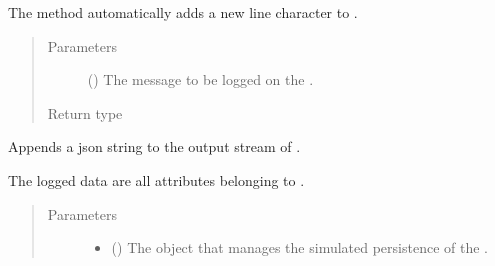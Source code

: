 \documentclass[letterpaper,10pt,english]{sphinxmanual}
\begin{document}
\begin{fulllineitems}
\begin{fulllineitems}
The method automatically adds a new line character to .
\begin{quote}\begin{description}
\item[{Parameters}] \leavevmode
{} () \textendash{} The message to be logged on the {\hyperref[\detokenize{app.domain.helpers:app.domain.helpers.smart_dataclasses.FileData.out_file}]{}}.

\item[{Return type}] \leavevmode
{}

\end{description}\end{quote}

\end{fulllineitems}


\begin{fulllineitems}
\label{\detokenize{app.domain.helpers:app.domain.helpers.smart_dataclasses.FileData.jwrite}}
Appends a json string to the output stream of .

The logged data are all attributes belonging to {\hyperref[\detokenize{app.domain.helpers:app.domain.helpers.smart_dataclasses.FileData.logger}]{}}.
\begin{quote}\begin{description}
\item[{Parameters}] \leavevmode\begin{itemize}
\item {} 
 ({\hyperref[\detokenize{app.domain:app.domain.cluster_groups.Cluster}]{}}) \textendash{} The {\hyperref[\detokenize{app.domain:app.domain.cluster_groups.Cluster}]{}}
object that manages the simulated persistence of the
{\hyperref[\detokenize{app.domain.helpers:app.domain.helpers.smart_dataclasses.FileData.name}]{}}.


\end{itemize}
\end{description}
\end{quote}
\end{fulllineitems}
\end{fulllineitems}
\end{document}
